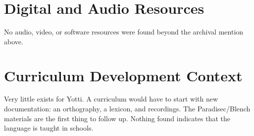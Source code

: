 \documentclass[12pt]{article}
\begin{document}
\section{Digital and Audio Resources}
No audio, video, or software resources were found beyond the archival mention above.

\section{Curriculum Development Context}
Very little exists for Yotti. A curriculum would have to start with new documentation: an orthography, a lexicon, and recordings. The Paradisec/Blench materials are the first thing to follow up. Nothing found indicates that the language is taught in schools.
\end{document}
